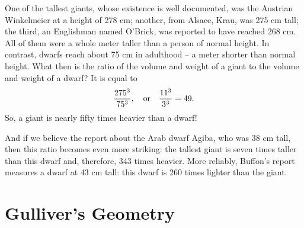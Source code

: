 One of the tallest giants, whose existence is well documented, was the Austrian Winkelmeier at a height of 278 cm; another, from Alsace, Krau, was 275 cm tall; the third, an Englishman named O'Brick, was reported to have reached 268 cm. All of them were a whole meter taller than a person of normal height. In contrast, dwarfs reach about 75 cm in adulthood -- a meter shorter than normal height. What then is the ratio of the volume and weight of a giant to the volume and weight of a dwarf? It is equal to
\begin{equation*}%
\frac{275^{3}}{75^{3}}, \qor \frac{11^{3}}{3^{3}} = 49.
\end{equation*}
So, a giant is nearly fifty times heavier than a dwarf!

And if we believe the report about the Arab dwarf Agiba, who was 38 cm tall, then this ratio becomes even more striking: the tallest giant is seven times taller than this dwarf and, therefore, 343 times heavier. More reliably, Buffon's report measures a dwarf at 43 cm tall: this dwarf is 260 times lighter than the giant.

\section{Gulliver's Geometry}
\label{sec-11.14}

